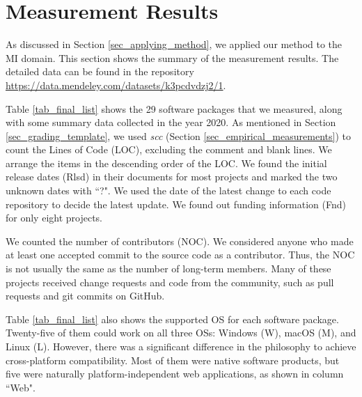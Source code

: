 \chapter{Measurement Results}
\label{ch_results}

As discussed in Section \ref{sec_applying_method}, we applied our method to the MI domain. This section shows the summary of the measurement results. The detailed data can be found in the repository \hyperlink{https://data.mendeley.com/datasets/k3pcdvdzj2/1}{https://data.mendeley.com/datasets/k3pcdvdzj2/1}.

Table \ref{tab_final_list} shows the 29 software packages that we measured, along with some summary data collected in the year 2020. As mentioned in Section \ref{sec_grading_template}, we used \textit{scc} (Section \ref{sec_empirical_measurements}) to count the Lines of Code (LOC), excluding the comment and blank lines. We arrange the items in the descending order of the LOC. We found the initial release dates (Rlsd) in their documents for most projects and marked the two unknown dates with ``?". We used the date of the latest change to each code repository to decide the latest update. We found out funding information (Fnd) for only eight projects.

We counted the number of contributors (NOC). We considered anyone who made at least one accepted commit to the source code as a contributor. Thus, the NOC is not usually the same as the number of long-term members. Many of these projects received change requests and code from the community, such as pull requests and git commits on GitHub.

Table \ref{tab_final_list} also shows the supported OS for each software package. Twenty-five of them could work on all three OSs: Windows (W), macOS (M), and Linux (L). However, there was a significant difference in the philosophy to achieve cross-platform compatibility. Most of them were native software products, but five were naturally platform-independent web applications, as shown in column ``Web".

